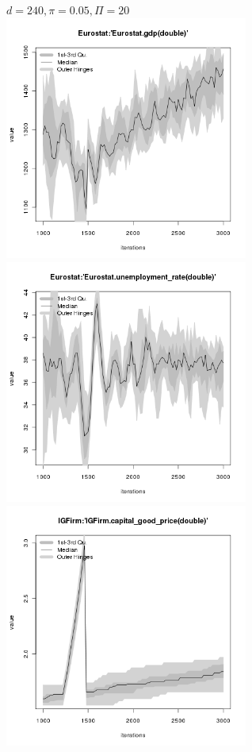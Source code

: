 \begin{figure}[ht!]
\centering\leavevmode
\begin{minipage}{17cm}
\centering\leavevmode
{$d=240, \pi=0.05, \Pi=20$}\\
\includegraphics[width=8cm]{./energy_shock/png/duration_240/intensity_0.05/frequency_20/Eurostat-gdp.png}
\includegraphics[width=8cm]{./energy_shock/png/duration_240/intensity_0.05/frequency_20/Eurostat-unemployment_rate.png}
\includegraphics[width=8cm]{./energy_shock/png/duration_240/intensity_0.05/frequency_20/IGFirm-capital_good_price.png}

\end{minipage}
\end{figure}
